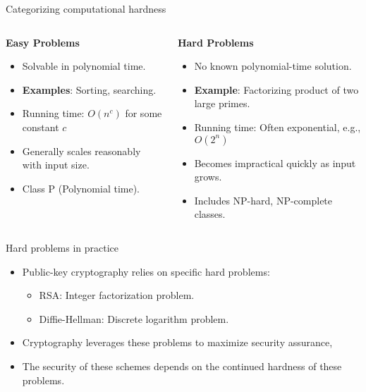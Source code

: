 \documentclass[aspectratio=169, lualatex, handout]{beamer}
\begin{document}
\begin{frame}{Categorizing computational hardness}
	\begin{columns}[c]
		\begin{column}{0.5\textwidth}
			\textbf{Easy Problems}
			\begin{itemize}[<+->]
				\item Solvable in polynomial time.
				\item \textbf{Examples}: Sorting, searching.
				\item Running time: $O(n^c)$ for some constant $c$
				\item Generally scales reasonably with input size.
				\item Class P (Polynomial time).
			\end{itemize}
		\end{column}
		\begin{column}{0.5\textwidth}
			\textbf{Hard Problems}
			\begin{itemize}[<+->]
				\item No known polynomial-time solution.
				\item \textbf{Example}: Factorizing product of two large primes.
				\item Running time: Often exponential, e.g., $O(2^n)$
				\item Becomes impractical quickly as input grows.
				\item Includes NP-hard, NP-complete classes.
			\end{itemize}
		\end{column}
	\end{columns}
\end{frame}

\begin{frame}{Hard problems in practice}
	\begin{itemize}
		\item Public-key cryptography relies on specific hard problems:
		      \begin{itemize}
			      \item RSA: Integer factorization problem.
			      \item Diffie-Hellman: Discrete logarithm problem.
		      \end{itemize}
		\item Cryptography leverages these problems to maximize security assurance,
		\item The security of these schemes depends on the continued hardness of these problems.
	\end{itemize}
\end{frame}
\end{document}
